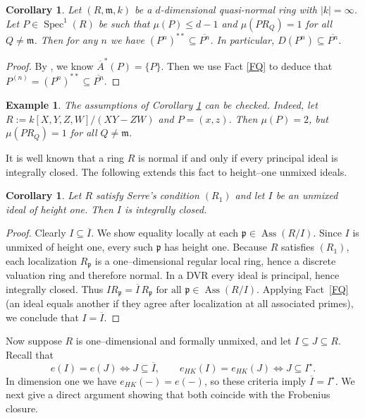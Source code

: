 \documentclass[11pt,a4paper]{amsart}
\numberwithin{equation}{section}
\newtheorem{corollary}[theorem]{Corollary}
\newtheorem{example}[theorem]{Example}
\DeclareMathOperator{\Ass}{Ass}
\DeclareMathOperator{\Spec}{Spec}
\newcommand{\fm}{\mathfrak{m}}
\newcommand{\fp}{\mathfrak{p}}
\begin{document}
\begin{corollary}\label{AP}Let $(R, \mathfrak{m},k)$ be a $d$-dimensional quasi-normal ring with $|k| = \infty$.
	Let $P \in \Spec^1(R)$ be such that $\mu(P) \leq d-1$ and $\mu(PR_Q) = 1$ for all $ Q \neq \mathfrak{m}$. Then for any $n$ we have
\(
(P^n)^{**} \subseteq\overline{P^n}	\). In particular,  
	\(
D( P^n ) \subseteq\overline {P^n
	}.\) 
\end{corollary}
\begin{proof}
	By \cite[Page 189]{Mcadam}, we know
	\(
\overline{A}^*(P) =   \{P\}
	\).  Then we use Fact \ref{FQ} to deduce that  
	\(
	P^{(n)} = (P^n)^{**} \subseteq\overline{P^n}	\).\end{proof}

\begin{example}The assumptions of {Corollary} \ref{AP} can be checked. 
Indeed, let 
	$R := k[X,Y,Z,W]/(XY-ZW)$ and $ P = (x,z)$. Then $\mu({P}) = 2$, but $\mu(PR_Q) = 1$  for all   $Q \neq \fm$.
\end{example}







It is well known that a ring $R$ is normal if and only if every principal ideal is integrally closed. The following extends this fact to height–one unmixed ideals.

\begin{corollary}\label{610}
	Let $R$ satisfy Serre’s condition $(R_1)$ and let $I$ be an unmixed ideal of height one. Then $I$ is integrally closed.
\end{corollary}

\begin{proof}
	Clearly $I \subseteq \overline{I}$. We show equality locally at each $\fp \in \Ass(R/I)$. Since $I$ is unmixed of height one, every such $\fp$ has height one. Because $R$ satisfies $(R_1)$, each localization $R_\fp$ is a one–dimensional regular local ring, hence a discrete valuation ring and therefore normal. In a DVR every ideal is principal, hence integrally closed. Thus
	\(
	IR_\fp = \overline{I}\,R_\fp
\text{ for all } \fp \in \Ass(R/I).
	\)
	Applying Fact~\ref{FQ} (an ideal equals another if they agree after localization at all associated primes), we conclude that $I=\overline{I}$.
\end{proof}

\medskip

Now suppose $R$ is one–dimensional and formally unmixed, and let $I\subseteq J \subseteq R$. Recall that
\[
e(I)=e(J) \iff J \subseteq \overline{I},
\qquad
e_{HK}(I)=e_{HK}(J) \iff J \subseteq I^\star.
\]
In dimension one we have $e_{HK}(-)=e(-)$, so these criteria imply $\overline{I}=I^\star$. We next give a direct argument showing that both coincide with the Frobenius closure.
\end{document}

